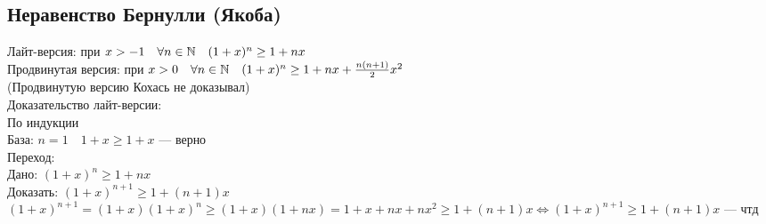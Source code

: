 \subsection{Неравенство Бернулли (Якоба)} %
Лайт-версия: при $x > -1 \quad \forall n \in \operatorname*{\mathbb{N}} \quad (1+x)^n \geq 1 + nx$\\
Продвинутая версия: при $x > 0 \quad \forall n \in \operatorname*{\mathbb{N}} \quad (1+x)^n \geq 1 + nx + \frac{n(n+1)}{2}x^2$\\
(Продвинутую версию Кохась не доказывал)\\
Доказательство лайт-версии:\\
По индукции\\
База: $n=1 \quad 1+x\geq1+x$ --- верно\\
Переход:\\
Дано: $(1+x)^n \geq 1 + nx$\\
Доказать: $(1+x)^{n+1} \geq 1 + (n+1)x$\\
$(1+x)^{n+1} = (1+x)(1+x)^{n} \geq (1+x)(1+nx) = 1+x+nx+nx^2 \geq 1+(n+1)x \iff (1+x)^{n+1} \geq 1+(n+1)x$ --- чтд
